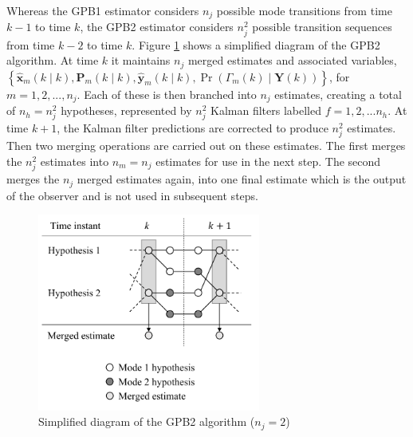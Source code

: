 Whereas the \gls{GPB1} estimator considers $n_j$ possible mode transitions from time $k-1$ to time $k$, the \gls{GPB2} estimator considers $n_j^2$ possible transition sequences from time $k-2$ to time $k$. Figure \ref{fig:mm-obs-gpb2} shows a simplified diagram of the \gls{GPB2} algorithm. At time $k$ it maintains $n_j$ merged estimates and associated variables, $\left\{ \hat{\mathbf{x}}_m(k \mid k), \mathbf{P}_m(k \mid k), \hat{\mathbf{y}}_m(k \mid k), \Pr(\Gamma_m(k) \mid \mathbf{Y}(k)) \right\}$, for $m=1,2,...,n_j$. Each of these is then branched into $n_j$ estimates, creating a total of $n_h=n_j^2$ hypotheses, represented by $n_j^2$ Kalman filters labelled $f=1,2,...n_h$. At time $k+1$, the Kalman filter predictions are corrected to produce $n_j^2$ estimates. Then two merging operations are carried out on these estimates. The first merges the $n_j^2$ estimates into $n_m=n_j$ estimates for use in the next step. The second merges the $n_j$ merged estimates again, into one final estimate which is the output of the observer and is not used in subsequent steps.
\begin{figure}[htp]
	\centering
	\includegraphics[height=6.5cm]{images/gpb2_diagram.pdf}
	\caption{Simplified diagram of the \gls{GPB2} algorithm ($n_j=2$)}
	\label{fig:mm-obs-gpb2}
\end{figure}

